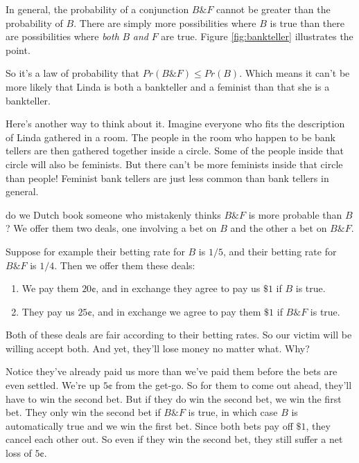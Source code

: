 \documentclass[justified]{tufte-book}
\providecommand{\tightlist}{%
  \setlength{\itemsep}{0pt}\setlength{\parskip}{0pt}}
\renewcommand{\wedge}{\mathbin{\&}}
\newcommand{\p}{Pr}
\theoremstyle{definition}
\theoremstyle{definition}
\theoremstyle{definition}
\theoremstyle{remark}
\begin{document}
In general, the probability of a conjunction \(B \wedge F\) cannot be greater than the probability of \(B\). There are simply more possibilities where \(B\) is true than there are possibilities where \emph{both} \(B\) \emph{and} \(F\) are true. Figure \ref{fig:bankteller} illustrates the point.

So it's a law of probability that \(\p(B \wedge F) \leq \p(B)\). Which means it can't be more likely that Linda is both a bankteller and a feminist than that she is a bankteller.

Here's another way to think about it. Imagine everyone who fits the description of Linda gathered in a room. The people in the room who happen to be bank tellers are then gathered together inside a circle. Some of the people inside that circle will also be feminists. But there can't be more feminists inside that circle than people! Feminist bank tellers are just less common than bank tellers in general.

 do we Dutch book someone who mistakenly thinks \(B \wedge F\) is more probable than \(B\)? We offer them two deals, one involving a bet on \(B\) and the other a bet on \(B \wedge F\).

Suppose for example their betting rate for \(B\) is \(1/5\), and their betting rate for \(B \wedge F\) is \(1/4\). Then we offer them these deals:

\begin{enumerate}
\def\labelenumi{\arabic{enumi}.}
\tightlist
\item
  We pay them \(20\)¢, and in exchange they agree to pay us \(\$1\) if \(B\) is true.
\item
  They pay us \(25\)¢, and in exchange we agree to pay them \(\$1\) if \(B \wedge F\) is true.
\end{enumerate}

Both of these deals are fair according to their betting rates. So our victim will be willing accept both. And yet, they'll lose money no matter what. Why?

Notice they've already paid us more than we've paid them before the bets are even settled. We're up \(5\)¢ from the get-go. So for them to come out ahead, they'll have to win the second bet. But if they do win the second bet, we win the first bet. They only win the second bet if \(B \wedge F\) is true, in which case \(B\) is automatically true and we win the first bet. Since both bets pay off \(\$1\), they cancel each other out. So even if they win the second bet, they still suffer a net loss of \(5\)¢.
\end{document}
